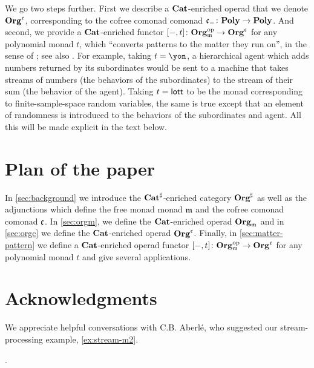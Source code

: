 We go two steps further. First we describe a $\mathbf{Cat}$-enriched operad \cite{Leinster:2004a} that we denote $\mathbf{Org}^{\mathfrak{c}}$, corresponding to the cofree comonad comonad $\mathfrak{c}_-\colon\mathbf{Poly}\to\mathbf{Poly}$. And second, we provide a $\mathbf{Cat}$-enriched functor $[-,t]\colon\mathbf{Org}_{\mathfrak{m}}^{\textnormal{op}}\to\mathbf{Org}^{\mathfrak{c}}$ for any polynomial monad $t$, which ``converts patterns to the matter they run on'', in the sense of \cite{libkind2024pattern}; see also \cite{Katsumata2020interaction}. For example, taking $t=\yon$, a hierarchical agent which adds numbers returned by its subordinates  would be sent to a machine that takes streams of numbers (the behaviors of the subordinates)  to the stream of their sum (the behavior of the agent). Taking $t=\mathsf{lott}$ to be the monad corresponding to finite-sample-space random variables, the same is true except that an element of randomness is introduced to the behaviors of the subordinates and agent. All this will be made explicit in the text below.


\section*{Plan of the paper}

In \cref{sec:background} we introduce the $\mathbf{Cat}^\sharp$-enriched category $\mathbf{Org}^\sharp$ as well as the adjunctions which define the free monad monad $\mathfrak{m}$ and the cofree comonad comonad $\mathfrak{c}$. 
In \cref{sec:orgm}, we define the $\mathbf{Cat}$-enriched operad $\mathbf{Org}_{\mathfrak{m}}$ and in \cref{sec:orgc} we define the $\mathbf{Cat}$-enriched operad $\mathbf{Org}^{\mathfrak{c}}$. 
Finally, in \cref{sec:matter-pattern} we define a $\mathbf{Cat}$-enriched operad functor $[-, t] \colon \mathbf{Org}_{\mathfrak{m}}^{\textnormal{op}} \to \mathbf{Org}^{\mathfrak{c}}$ for any polynomial monad $t$ and give several applications.

\section*{Acknowledgments}
We appreciate helpful conversations with C.B. Aberl\'e, who suggested our stream-processing example, \cref{ex:stream-m2}.

.